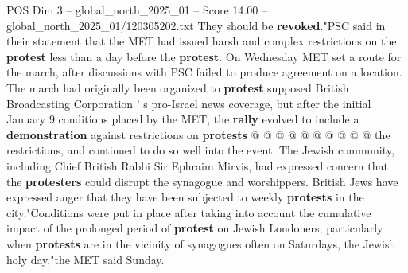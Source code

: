 \begin{textsample}{POS Dim 3 – global\_north\_2025\_01 – Score 14.00 – global\_north\_2025\_01/120305202.txt}
They should be \textbf{revoked}."PSC said in their statement that the MET had issued harsh and complex restrictions on the \textbf{protest} less than a day before the \textbf{protest}.
On Wednesday MET set a route for the march, after discussions with PSC failed to produce agreement on a location.
The march had originally been organized to \textbf{protest} supposed British Broadcasting Corporation ' s pro-Israel news coverage, but after the initial January 9 conditions placed by the MET, the \textbf{rally} evolved to include a \textbf{demonstration} against restrictions on \textbf{protests} @ @ @ @ @ @ @ @ @ @ the restrictions, and continued to do so well into the event.
The Jewish community, including Chief British Rabbi Sir Ephraim Mirvis, had expressed concern that the \textbf{protesters} could disrupt the synagogue and worshippers.
British Jews have expressed anger that they have been subjected to weekly \textbf{protests} in the city."Conditions were put in place after taking into account the cumulative impact of the prolonged period of \textbf{protest} on Jewish Londoners, particularly when \textbf{protests} are in the vicinity of synagogues often on Saturdays, the Jewish holy day,"the MET said Sunday.

\end{textsample}
